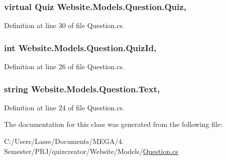 \subsubsection[{Quiz}]{\setlength{\rightskip}{0pt plus 5cm}virtual {\bf Quiz} Website.\+Models.\+Question.\+Quiz\hspace{0.3cm}{\ttfamily [get]}, {\ttfamily [set]}}\label{class_website_1_1_models_1_1_question_a08bdca8c44c01af0f79f80a7f41ad459}


Definition at line 30 of file Question.\+cs.

\hypertarget{class_website_1_1_models_1_1_question_a54622ce995fec691fc935f77bd95a7a3}{}
\subsubsection[{Quiz\+Id}]{\setlength{\rightskip}{0pt plus 5cm}int Website.\+Models.\+Question.\+Quiz\+Id\hspace{0.3cm}{\ttfamily [get]}, {\ttfamily [set]}}\label{class_website_1_1_models_1_1_question_a54622ce995fec691fc935f77bd95a7a3}


Definition at line 26 of file Question.\+cs.

\hypertarget{class_website_1_1_models_1_1_question_a503746cf0052ab25134a770284ea2691}{}
\subsubsection[{Text}]{\setlength{\rightskip}{0pt plus 5cm}string Website.\+Models.\+Question.\+Text\hspace{0.3cm}{\ttfamily [get]}, {\ttfamily [set]}}\label{class_website_1_1_models_1_1_question_a503746cf0052ab25134a770284ea2691}


Definition at line 24 of file Question.\+cs.



The documentation for this class was generated from the following file\+:\begin{DoxyCompactItemize}
\item 
C\+:/\+Users/\+Lasse/\+Documents/\+M\+E\+G\+A/4. Semester/\+P\+R\+J/quizcreator/\+Website/\+Models/\hyperlink{_question_8cs}{Question.\+cs}\end{DoxyCompactItemize}
